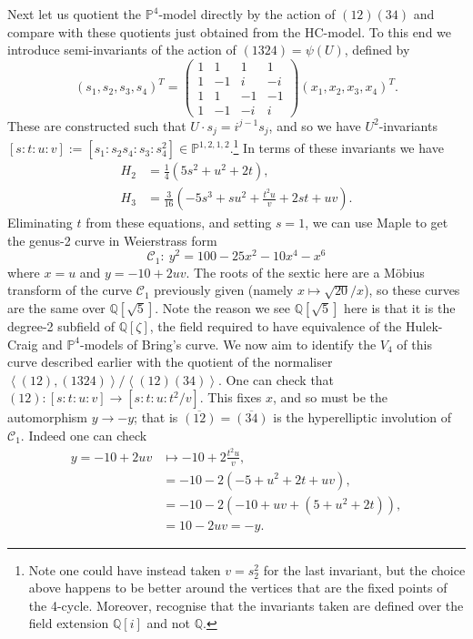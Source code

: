 \documentclass{amsart}
\newcommand{\pround}[1]{\left( #1 \right)}
\newcommand{\pangle}[1]{\left\langle #1 \right\rangle}
\begin{document}
Next let us quotient the $\mathbb{P}^4$-model directly by the action of $(12)(34)$ and compare with these quotients just obtained from the HC-model.
To this end we introduce semi-invariants of the action of $(1324) = \psi(U)$, defined by 
\[
(s_1, s_2, s_3, s_4)^T = \begin{pmatrix}
    1 & 1 & 1 & 1 \\ 1 & -1 & i & -i \\ 1 & 1 & -1 & -1 \\ 1 & -1 & -i & i
    \end{pmatrix} (x_1, x_2, x_3, x_4)^T  . 
\]
These are constructed such that $U \cdot s_j = i^{j-1} s_j$, and so we have $U^2$-invariants $[s:t:u:v] := [s_1: s_2 s_4 : s_3 : s_4^2] \in \mathbb{P}^{1,2,1,2}$.\footnote{Note one could have instead taken $v=s_2^2$ for the last invariant, but the choice above happens to be better around the vertices that are the fixed points of the 4-cycle. Moreover, recognise that the invariants taken are defined over the field extension $\mathbb{Q}[i]$ and not $\mathbb{Q}$.} In terms of these invariants we have 
\begin{align*}
    H_2 &= \frac{1}{4} \pround{5s^2 + u^2 + 2t}  , \\
    H_3 &= \frac{3}{16} \pround{-5 s^3 + su^2 + \frac{t^2u}{v} + 2st + uv}  .  
\end{align*}
Eliminating $t$ from these equations, and setting $s=1$, we can use Maple to get the genus-2 curve in Weierstrass form
\begin{equation}
\label{qc1p} 
\mathcal{C}_1:\  y^2 = 100-25x^2-10x^4-x^6
\end{equation}
where $x=u$ and $y=-10+2uv$. The roots of the sextic here are a M\"obius transform of the curve $\mathcal{C}_1$ previously given (namely $x \mapsto \sqrt{20}/x$), so these curves are the same over $\mathbb{Q}[\sqrt{5}]$. Note the reason we see $\mathbb{Q}[\sqrt{5}]$ here is that it is the degree-2 subfield of $\mathbb{Q}[\zeta]$, the field required to have equivalence of the Hulek-Craig and $\mathbb{P}^4$-models of Bring's curve. We now aim to identify the $V_4$ of this curve described earlier   with the quotient of the normaliser  $\pangle{(12), (1324)}/\pangle{(12)(34)}$. One can check that $(12) : [s:t:u:v] \to [s:t:u:t^2/v]$. This fixes $x$, and so must be the automorphism $y \to -y$; that is $\overline{(12)} = \overline{(34)}$ is the hyperelliptic involution of
$\mathcal{C}_1$. Indeed one can check 
\begin{align*}
    y = -10 + 2uv &\mapsto -10 + 2\frac{t^2u}{v}  , \\
    &= -10 - 2\pround{-5 + u^2 + 2t + uv}  , \\
    &= -10 - 2\pround{-10 + uv + (5 + u^2 + 2t)}  , \\
    &= 10-2uv = -y  . 
\end{align*}
\end{document}
